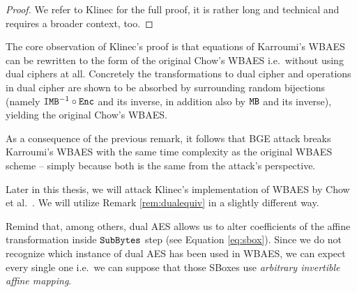 	\begin{proof}
		We refer to Klinec \cite{klinec2013white} for the full proof, it is rather long and technical and requires a broader context, too.
	\end{proof}
	
	\begin{remark}
	\label{rem:dualequiv}
		The core observation of Klinec's proof is that equations of Karroumi's WBAES can be rewritten to the form of the original Chow's WBAES i.e.\ without using dual ciphers at all. Concretely the transformations to dual cipher and operations in dual cipher are shown to be absorbed by surrounding random bijections (namely $\texttt{IMB}^{-1}\circ\texttt{Enc}$ and its inverse, in addition also by $\texttt{MB}$ and its inverse), yielding the original Chow's WBAES.
	\end{remark}
	
	As a consequence of the previous remark, it follows that BGE attack breaks Karroumi's WBAES with the same time complexity as the original WBAES scheme -- simply because both is the same from the attack's perspective.
	
	\begin{note}
	\label{note:dualsbox}
		Later in this thesis, we will attack Klinec's implementation \cite{klinec2013implementation} of WBAES by Chow et al.\ \cite{chow2002aes}. We will utilize Remark \ref{rem:dualequiv} in a slightly different way.
		
		Remind that, among others, dual AES allows us to alter coefficients of the affine transformation inside $\texttt{SubBytes}$ step (see Equation \ref{eq:sbox}). Since we do not recognize which instance of dual AES has been used in WBAES, we can expect every single one i.e.\ we can suppose that those SBoxes use {\em arbitrary invertible affine mapping}.
	\end{note}
	
